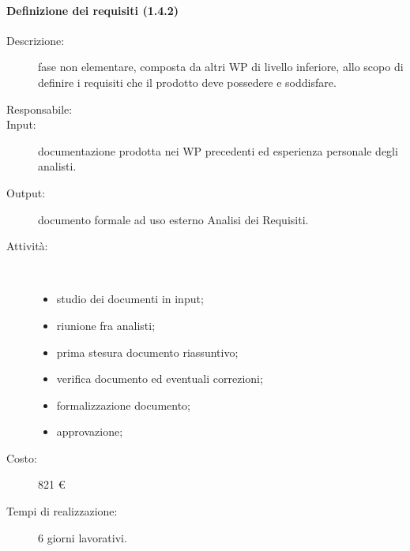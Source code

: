 \begin{description}
\paragraph{Definizione dei requisiti (1.4.2)}
\begin{description}
\item[Descrizione:] fase non elementare, composta da altri WP di livello inferiore, allo scopo di definire i requisiti che il prodotto deve possedere e soddisfare.
\item[Responsabile:] 
\item[Input:] documentazione prodotta nei WP precedenti ed esperienza personale degli analisti.
\item[Output:] documento formale ad uso esterno Analisi dei Requisiti.
\item[Attività:]\mbox{}\\[-1.5\baselineskip]
	\begin{itemize}
	\item studio dei documenti in input;
	\item riunione fra analisti;
	\item prima stesura documento riassuntivo;
	\item verifica documento ed eventuali correzioni;
	\item formalizzazione documento;
	\item approvazione;
	\end{itemize}
\item[Costo:] 821 \euro{}
\item[Tempi di realizzazione:] 6 giorni lavorativi.
\end{description}


\end{description}
